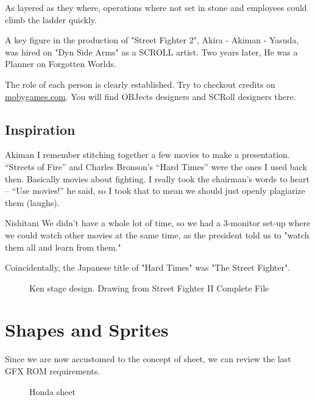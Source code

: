 As layered as they where, operations where not set in stone and employees could climb the ladder quickly. 

A key figure in the production of "Street Fighter 2", Akira - Akiman - Yasuda, was hired on "Dyn Side Arms" as a SCROLL artist. Two years later, He was a Planner on Forgotten Worlds.

\begin{trivia}
The role of each person is clearly established. Try to checkout credits on \url{mobygames.com}. You will find OBJects designers and SCRoll designers there.
\end{trivia}


\subsection{Inspiration}



\begin{q}{Akiman\cite{ffdevinterview}}
I remember stitching together a few movies to make a presentation. “Streets of Fire” and Charles Bronson’s “Hard Times” were the ones I used back then. Basically movies about fighting. I really took the chairman’s words to heart – “Use movies!” he said, so I took that to mean we should just openly plagiarize them (laughs).
\end{q}

\begin{q}{Nishitani\cite{ffdevinterview}}
We didn't have a whole lot of time, so we had a 3-monitor set-up where we could watch other movies at the same time, as the president told us to "watch them all and learn from them."
\end{q}

Coincidentally, the Japanese title of "Hard Times" was "The Street Fighter".

 \begin{figure}[H]
\caption*{Ken stage design. Drawing from Street Fighter II Complete File}
\end{figure}

\section{Shapes and Sprites}
Since we are now accustomed to the concept of sheet, we can review the last GFX ROM requirements.  



 \begin{figure}[H]
\caption*{Honda sheet}
\end{figure}